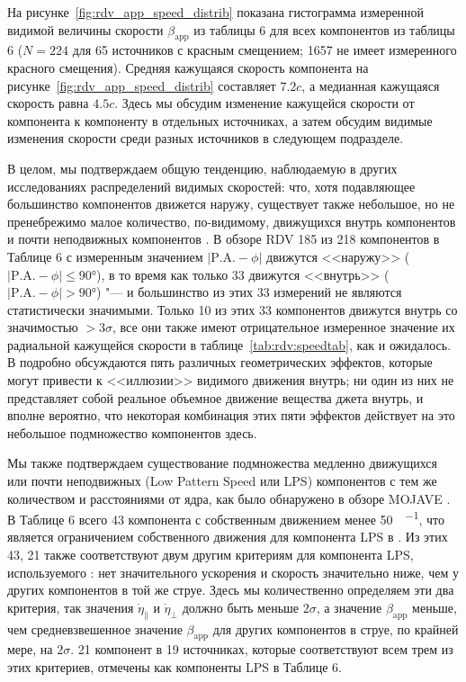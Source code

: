 На рисунке~\ref{fig:rdv_app_speed_distrib} показана гистограмма измеренной видимой величины скорости
$\beta_\text{app}$ из таблицы 6 для всех компонентов из таблицы 6 ($N = 224$ для 65 источников с
красным смещением; 1657 не имеет измеренного красного смещения). Средняя кажущаяся
скорость компонента на рисунке~\ref{fig:rdv_app_speed_distrib} составляет $7.2 c$, а медианная
кажущаяся скорость равна $4.5 c$. Здесь мы обсудим изменение кажущейся скорости от компонента к
компоненту в отдельных источниках, а затем обсудим видимые изменения скорости среди разных
источников в следующем подразделе.

В целом, мы подтверждаем общую тенденцию, наблюдаемую в других исследованиях распределений видимых
скоростей: что, хотя подавляющее большинство компонентов движется наружу, существует также
небольшое, но не пренебрежимо малое количество, по-видимому, движущихся внутрь компонентов и почти
неподвижных компонентов \cite{Lister_2009b,Britzen_2008}. В обзоре RDV 185 из 218 компонентов в
Таблице 6 с измеренным значением $|\text{P.A.} - \phi |$ движутся <<наружу>> ($|\text{P.A.} -
\phi|\leqslant \ang{90}$), в то время как только 33 движутся <<внутрь>> ($|\text{P.A.} - \phi| >
\ang{90}$) "--- и большинство из этих 33 измерений не являются статистически значимыми. Только 10 из
этих 33 компонентов движутся внутрь со значимостью $>3\sigma$, все они также имеют отрицательное
измеренное значение их радиальной кажущейся скорости в таблице~\ref{tab:rdv:speedtab}, как и
ожидалось. В \cite{Lister_2009b} подробно обсуждаются пять различных геометрических эффектов,
которые могут привести к <<иллюзии>> видимого движения внутрь; ни один из них не представляет собой
реальное объемное  движение вещества джета внутрь, и вполне вероятно, что некоторая комбинация этих
пяти эффектов действует на это небольшое подмножество компонентов здесь.

Мы также подтверждаем существование подмножества медленно движущихся или почти неподвижных (Low
Pattern Speed или LPS) компонентов с тем же количеством и расстояниями от ядра, как было
обнаружено в обзоре MOJAVE \cite{Lister_2009b}. В Таблице 6 всего 43 компонента с собственным
движением менее \SI{50}{\uas\per\year}, что является ограничением собственного движения для
компонента LPS в \cite{Lister_2009b}. Из этих 43, 21 также соответствуют двум другим критериям для
компонента LPS, используемого \cite{Lister_2009b}: нет значительного ускорения и скорость
значительно ниже, чем у других компонентов в той же струе. Здесь мы количественно определяем эти два
критерия, так значения $\dot{\eta}_{\parallel}$ и $\dot{\eta}_{\perp}$ должно быть меньше
$2\sigma$, а значение $\beta_\text{app}$ меньше, чем средневзвешенное значение $\beta_\text{app}$
для других компонентов в струе, по крайней мере, на $2\sigma$. 21 компонент в 19 источниках,
которые соответствуют всем трем из этих критериев, отмечены как компоненты LPS в Таблице 6.

